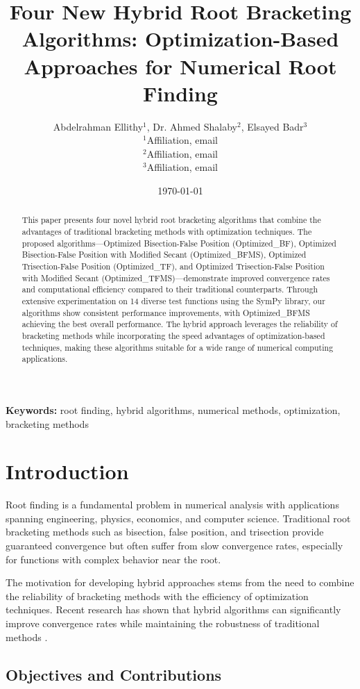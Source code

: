 \documentclass[11pt,a4paper]{article}
\title{\textbf{Four New Hybrid Root Bracketing Algorithms: Optimization-Based Approaches for Numerical Root Finding}}
\author{
    Abdelrahman Ellithy$^{1}$, Dr. Ahmed Shalaby$^{2}$, Elsayed Badr$^{3}$ \\
    \small $^{1}$Affiliation, email \\
    \small $^{2}$Affiliation, email \\
    \small $^{3}$Affiliation, email
}
\date{\today}
\begin{document}
\maketitle

\begin{abstract}
This paper presents four novel hybrid root bracketing algorithms that combine the advantages of traditional bracketing methods with optimization techniques. The proposed algorithms—Optimized Bisection-False Position (Optimized\_BF), Optimized Bisection-False Position with Modified Secant (Optimized\_BFMS), Optimized Trisection-False Position (Optimized\_TF), and Optimized Trisection-False Position with Modified Secant (Optimized\_TFMS)—demonstrate improved convergence rates and computational efficiency compared to their traditional counterparts. Through extensive experimentation on 14 diverse test functions using the SymPy library, our algorithms show consistent performance improvements, with Optimized\_BFMS achieving the best overall performance. The hybrid approach leverages the reliability of bracketing methods while incorporating the speed advantages of optimization-based techniques, making these algorithms suitable for a wide range of numerical computing applications.
\end{abstract}

\noindent\textbf{Keywords:} root finding, hybrid algorithms, numerical methods, optimization, bracketing methods

\section{Introduction}

Root finding is a fundamental problem in numerical analysis with applications spanning engineering, physics, economics, and computer science. Traditional root bracketing methods such as bisection, false position, and trisection provide guaranteed convergence but often suffer from slow convergence rates, especially for functions with complex behavior near the root.

The motivation for developing hybrid approaches stems from the need to combine the reliability of bracketing methods with the efficiency of optimization techniques. Recent research has shown that hybrid algorithms can significantly improve convergence rates while maintaining the robustness of traditional methods \cite{sabharwal2019blended, badr2022novel}.

\subsection{Objectives and Contributions}
\end{document}
